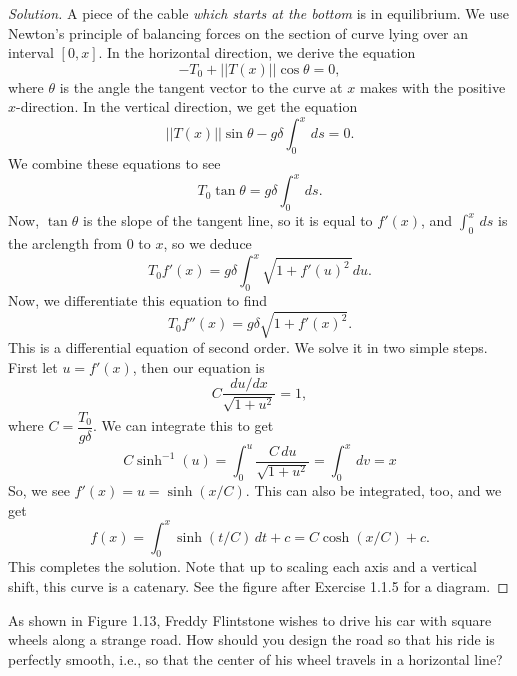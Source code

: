 \documentclass[Shifrin_Solutions_Spring_2018]{subfiles}
\begin{document}
\begin{proof}[Solution]
A piece of the cable \emph{which starts at the bottom} is in equilibrium. We use 
Newton's principle of balancing forces on the section of curve lying over an 
interval $[0,x]$.
In the horizontal direction, we derive the equation
\[
-T_0 + ||T(x)||\cos\theta = 0 ,
\]
where $\theta$ is the angle the tangent vector to the curve at $x$ makes with
the positive $x$-direction. In the vertical direction, we get the equation
\[
||T(x)|| \sin\theta   - g\delta \int_0^x \, ds = 0 .
\]
We combine these equations to see
\[
T_0  \tan\theta  = g \delta \int_0^x \, ds .
\]
Now, $\tan\theta$ is the slope of the tangent line, so it is equal to $f'(x)$,
and $\int_0^x \, ds$ is the arclength from $0$ to $x$, so we deduce
\[
T_0 f'(x) = g \delta \int_0^x \sqrt{ 1 + f'(u)^2\, } du .
\]
Now, we differentiate this equation to find
\[
T_0 f''(x) = g \delta \sqrt{1+ f'(x)^2 }.
\]
This is a differential equation of second order. We solve it in two simple
steps. First let $u = f'(x)$, then our equation is
\[
C\dfrac{du/dx}{\sqrt{1+u^2 }}  = 1,
\]
where $C =  \dfrac{T_0}{g\delta}$.
We can integrate this to get
\[
C \sinh^{-1}(u) = \int_0^u \dfrac{C \, du}{\sqrt{1+u^2}} = \int_0^x \, dv = x
\]
So, we see $f'(x) = u = \sinh(x/C)$. This can also be integrated, too, and we
get
\[
f(x) = \int_0^x \sinh(t/C) \, dt + c = C \cosh(x/C) + c .
\]
This completes the solution. Note that up to scaling each axis and a vertical
shift, this curve is a catenary. See the figure after Exercise 1.1.5 for a
diagram.
\end{proof}

\clearpage



\begin{exercise}
As shown in Figure 1.13, Freddy Flintstone wishes to drive his car with square 
wheels along a strange road. How should you design the road so that his ride is 
perfectly smooth, i.e., so that the center of his wheel travels in a horizontal 
line?
\end{exercise}
\end{document}
